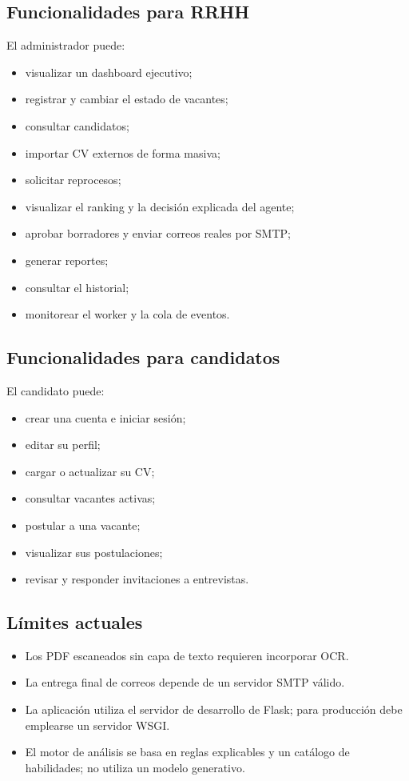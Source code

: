 \documentclass[12pt,a4paper]{article}
\begin{document}
\subsection{Funcionalidades para RRHH}

El administrador puede:

\begin{itemize}[leftmargin=*]
    \item visualizar un dashboard ejecutivo;
    \item registrar y cambiar el estado de vacantes;
    \item consultar candidatos;
    \item importar CV externos de forma masiva;
    \item solicitar reprocesos;
    \item visualizar el ranking y la decisión explicada del agente;
    \item aprobar borradores y enviar correos reales por SMTP;
    \item generar reportes;
    \item consultar el historial;
    \item monitorear el worker y la cola de eventos.
\end{itemize}

\subsection{Funcionalidades para candidatos}

El candidato puede:

\begin{itemize}[leftmargin=*]
    \item crear una cuenta e iniciar sesión;
    \item editar su perfil;
    \item cargar o actualizar su CV;
    \item consultar vacantes activas;
    \item postular a una vacante;
    \item visualizar sus postulaciones;
    \item revisar y responder invitaciones a entrevistas.
\end{itemize}

\subsection{Límites actuales}

\begin{itemize}[leftmargin=*]
    \item Los PDF escaneados sin capa de texto requieren incorporar OCR.
    \item La entrega final de correos depende de un servidor SMTP válido.
    \item La aplicación utiliza el servidor de desarrollo de Flask; para producción debe emplearse un servidor WSGI.
    \item El motor de análisis se basa en reglas explicables y un catálogo de habilidades; no utiliza un modelo generativo.
\end{itemize}
\end{document}
